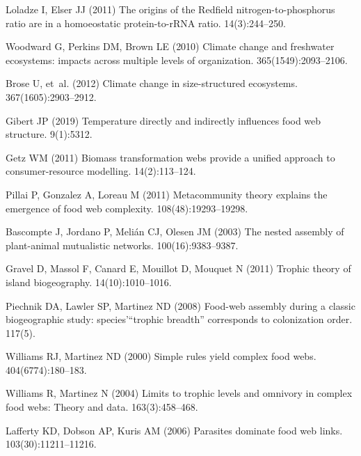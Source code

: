 \documentclass[twocolumn,preprintnumbers,amsmath,amssymb,superscriptaddress]{revtex4}
\begin{document}
\begin{thebibliography}{10}
Loladze I, Elser JJ (2011) The origins of the {R}edfield nitrogen-to-phosphorus
  ratio are in a homoeostatic protein-to-r{RNA} ratio.
 14(3):244--250.

Woodward G, Perkins DM, Brown LE (2010) {Climate change and freshwater
  ecosystems: impacts across multiple levels of organization}.
 365(1549):2093--2106.

Brose U, et~al. (2012) Climate change in size-structured ecosystems.
 367(1605):2903--2912.

Gibert JP (2019) Temperature directly and indirectly influences food web
  structure.
 9(1):5312.

Getz WM (2011) {Biomass transformation webs provide a unified approach to
  consumer-resource modelling.}
 14(2):113--124.

Pillai P, Gonzalez A, Loreau M (2011) {Metacommunity theory explains the
  emergence of food web complexity.}
 108(48):19293--19298.

Bascompte J, Jordano P, Meli{\'a}n CJ, Olesen JM (2003) {The nested assembly of
  plant-animal mutualistic networks.}
 100(16):9383--9387.

Gravel D, Massol F, Canard E, Mouillot D, Mouquet N (2011) Trophic theory of
  island biogeography.
 14(10):1010--1016.

Piechnik DA, Lawler SP, Martinez ND (2008) {Food-web assembly during a classic
  biogeographic study: species'{\textquotedblleft}trophic
  breadth{\textquotedblright} corresponds to colonization order}.
 117(5).

Williams RJ, Martinez ND (2000) {Simple rules yield complex food webs}.
 404(6774):180--183.

Williams R, Martinez N (2004) Limits to trophic levels and omnivory in complex
  food webs: Theory and data.
 163(3):458--468.

Lafferty KD, Dobson AP, Kuris AM (2006) {Parasites dominate food web links.}
 103(30):11211--11216.


\end{thebibliography}
\end{document}
